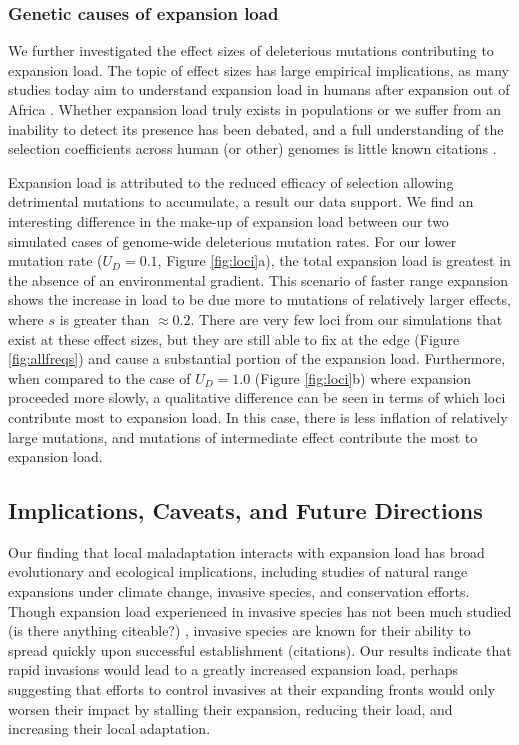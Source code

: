 \subsubsection*{Genetic causes of expansion load}
We further investigated the effect sizes of deleterious mutations contributing to expansion load. The topic of effect sizes has large empirical implications, as many studies today aim to understand expansion load in humans after expansion out of Africa \citep{Henn:2015,Henn:2015b, Lohmueller:2014, Lohmueller:2014b, Gravel:2016}. Whether expansion load truly exists in populations or we suffer from an inability to detect its presence has been debated, and a full understanding of the selection coefficients across human (or other) genomes is little known \color{red}citations \color{black}.

Expansion load is attributed to the reduced efficacy of selection allowing detrimental mutations to accumulate, a result our data support. We find an interesting difference in the make-up of expansion load between our two simulated cases of genome-wide deleterious mutation rates. For our lower mutation rate ($U_D = 0.1$, Figure \ref{fig:loci}a), the total expansion load is greatest in the absence of an environmental gradient. This scenario of faster range expansion shows the increase in load to be due more to mutations of relatively larger effects, where $s$ is greater than $\approx 0.2$. There are very few loci from our simulations that exist at these effect sizes, but they are still able to fix at the edge (Figure \ref{fig:allfreqs}) and cause a substantial portion of the expansion load. Furthermore, when compared to the case of $U_D = 1.0$ (Figure \ref{fig:loci}b) where expansion proceeded more slowly, a qualitative difference can be seen in terms of which loci contribute most to expansion load. In this case, there is less inflation of relatively large mutations, and mutations of intermediate effect contribute the most to expansion load. 




\subsection*{Implications, Caveats, and Future Directions}

Our finding that local maladaptation interacts with expansion load has broad evolutionary and ecological implications, including studies of natural range expansions under climate change, invasive species, and conservation efforts. Though expansion load experienced in invasive species has not been much studied \color{red}(is there anything citeable?) \color{black}, invasive species are known for their ability to spread quickly upon successful establishment \color{red}(citations)\color{black}. Our results indicate that rapid invasions would lead to a greatly increased expansion load, perhaps suggesting that efforts to control invasives at their expanding fronts would only worsen their impact by stalling their expansion, reducing their load, and increasing their local adaptation. 

